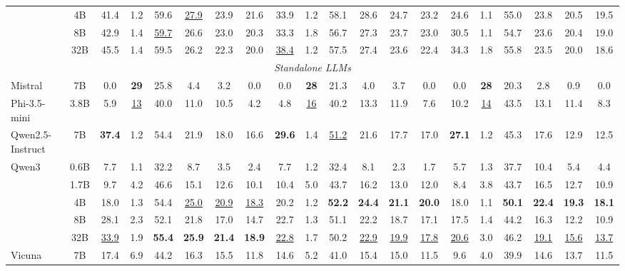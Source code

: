 \begin{table}[t]
{\begin{tabular}{lc|cccccc|cccccc|cccccc}
 & 4B & 41.4 & 1.2 & 59.6 & \underline{27.9} & 23.9 & 21.6 & 33.9 & 1.2 & 58.1 & 28.6 & 24.7 & 23.2 & 24.6 & 1.1 & 55.0 & 23.8 & 20.5 & 19.5 \\
 & 8B & 42.9 & 1.4 & \underline{59.7} & 26.6 & 23.0 & 20.3 & 33.3 & 1.8 & 56.7 & 27.3 & 23.7 & 23.0 & 30.5 & 1.1 & 54.7 & 23.6 & 20.4 & 19.0 \\
 & 32B & 45.5 & 1.4 & 59.5 & 26.2 & 22.3 & 20.0 & \underline{38.4} & 1.2 & 57.5 & 27.4 & 23.6 & 22.4 & 34.3 & 1.8 & 55.8 & 23.5 & 20.0 & 18.6 \\
\midrule
\multicolumn{20}{c}{\textit{Standalone LLMs}} \\
\midrule
Mistral & 7B & 0.0 & \textbf{29} & 25.8 & 4.4 & 3.2 & 0.0 & 0.0 & \textbf{28} & 21.3 & 4.0 & 3.7 & 0.0 & 0.0 & \textbf{28} & 20.3 & 2.8 & 0.9 & 0.0 \\
Phi-3.5-mini & 3.8B & 5.9 & \underline{13} & 40.0 & 11.0 & 10.5 & 4.2 & 4.8 & \underline{16} & 40.2 & 13.3 & 11.9 & 7.6 & 10.2 & \underline{14} & 43.5 & 13.1 & 11.4 & 8.3 \\
Qwen2.5-Instruct & 7B & \textbf{37.4} & 1.2 & 54.4 & 21.9 & 18.0 & 16.6 & \textbf{29.6} & 1.4 & \underline{51.2} & 21.6 & 17.7 & 17.0 & \textbf{27.1} & 1.2 & 45.3 & 17.6 & 12.9 & 12.5 \\
\multirow{5}{*}{Qwen3} & 0.6B & 7.7 & 1.1 & 32.2 & 8.7 & 3.5 & 2.4 & 7.7 & 1.2 & 32.4 & 8.1 & 2.3 & 1.7 & 5.7 & 1.3 & 37.7 & 10.4 & 5.4 & 4.4 \\
 & 1.7B & 9.7 & 4.2 & 46.6 & 15.1 & 12.6 & 10.1 & 10.4 & 5.0 & 43.7 & 16.2 & 13.0 & 12.0 & 8.4 & 3.8 & 43.7 & 16.5 & 12.7 & 10.9 \\
 & 4B & 18.0 & 1.3 & 54.4 & \underline{25.0} & \underline{20.9} & \underline{18.3} & 20.2 & 1.2 & \textbf{52.2} & \textbf{24.4} & \textbf{21.1} & \textbf{20.0} & 18.0 & 1.1 & \textbf{50.1} & \textbf{22.4} & \textbf{19.3} & \textbf{18.1} \\
 & 8B & 28.1 & 2.3 & 52.1 & 21.8 & 17.0 & 14.7 & 22.7 & 1.3 & 51.1 & 22.2 & 18.7 & 17.1 & 17.5 & 1.4 & 44.2 & 16.3 & 12.2 & 10.9 \\
 & 32B & \underline{33.9} & 1.9 & \textbf{55.4} & \textbf{25.9} & \textbf{21.4} & \textbf{18.9} & \underline{22.8} & 1.7 & 50.2 & \underline{22.9} & \underline{19.9} & \underline{17.8} & \underline{20.6} & 3.0 & 46.2 & \underline{19.1} & \underline{15.6} & \underline{13.7} \\
\multirow{2}{*}{Vicuna} & 7B & 17.4 & 6.9 & 44.2 & 16.3 & 15.5 & 11.8 & 14.6 & 5.2 & 41.0 & 15.4 & 15.0 & 11.5 & 9.6 & 4.0 & 39.9 & 14.6 & 13.7 & 11.5 \\

\end{tabular}}
\end{table}
